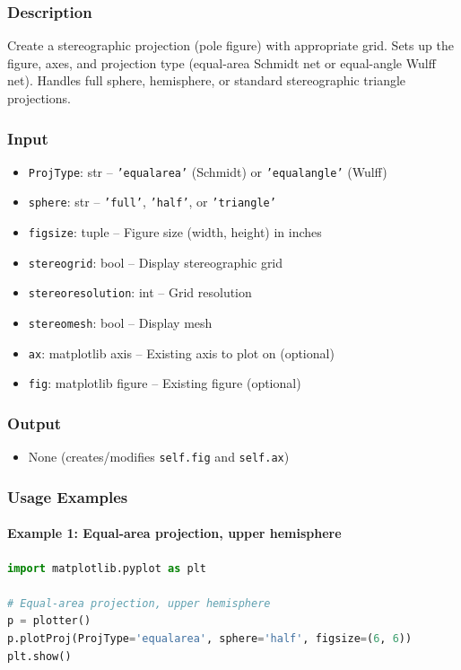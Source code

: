 \documentclass[11pt,a4paper]{article}
\begin{document}
\subsubsection{Description}
Create a stereographic projection (pole figure) with appropriate grid. Sets up the figure, axes, and projection type (equal-area Schmidt net or equal-angle Wulff net). Handles full sphere, hemisphere, or standard stereographic triangle projections.

\subsubsection{Input}
\begin{itemize}[leftmargin=*]
    \item \texttt{ProjType}: str -- \texttt{'equalarea'} (Schmidt) or \texttt{'equalangle'} (Wulff)
    \item \texttt{sphere}: str -- \texttt{'full'}, \texttt{'half'}, or \texttt{'triangle'}
    \item \texttt{figsize}: tuple -- Figure size (width, height) in inches
    \item \texttt{stereogrid}: bool -- Display stereographic grid
    \item \texttt{stereoresolution}: int -- Grid resolution
    \item \texttt{stereomesh}: bool -- Display mesh
    \item \texttt{ax}: matplotlib axis -- Existing axis to plot on (optional)
    \item \texttt{fig}: matplotlib figure -- Existing figure (optional)
\end{itemize}

\subsubsection{Output}
\begin{itemize}[leftmargin=*]
    \item None (creates/modifies \texttt{self.fig} and \texttt{self.ax})
\end{itemize}

\subsubsection{Usage Examples}

\paragraph{Example 1: Equal-area projection, upper hemisphere}
\begin{lstlisting}[language=Python, caption=Equal-area hemisphere projection]
import matplotlib.pyplot as plt

# Equal-area projection, upper hemisphere
p = plotter()
p.plotProj(ProjType='equalarea', sphere='half', figsize=(6, 6))
plt.show()
\end{lstlisting}
\end{document}
